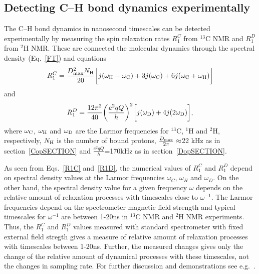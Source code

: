 \documentclass[aps,prl,superscriptaddress,twocolumn]{revtex4}
\begin{document}
\subsection{Detecting C--H bond dynamics experimentally}

The C--H bond dynamics in nanosecond timescales can be detected experimentally by measuring
the spin relaxation rates $R_1^C$ from $^{13}$C NMR and $R_1^D$ from $^2$H NMR. 
These are connected the molecular dynamics through the spectral density (Eq.~\ref{FT}) and equations
\begin{equation}\label{R1C}
R_{1}^{C}=\frac{D_{\rm{max}}^2N_{\rm{H}}}{20}\bigg[j(\omega_{\rm{H}}-\omega_{\rm{C}})+3j(\omega_{\rm{C}})+6j(\omega_{\rm{C}}+\omega_{\rm{H}})\bigg]
\end{equation}
and
\begin{equation}\label{R1D}
R_{1}^{D}=\frac{12\pi^2}{40}\bigg(\frac{e^2qQ}{h}\bigg)^2\bigg[j(\omega_{\rm{D}})+4j(2\omega_{\rm{D}})\bigg],
\end{equation}
where $\omega_{\rm{C}}$, $\omega_{\rm{H}}$ and $\omega_{\rm{D}}$ are the Larmor frequencies for $^{13}$C, $^1$H and $^2$H, respectively, 
$N_{\rm{H}}$ is the number of bound protons, $\frac{D_{\rm{max}}}{2\pi}\approx$22 kHz as in section~\ref{CopSECTION} and
$\frac{e^2qQ}{h}$=170kHz as in section~\ref{DopSECTION}.

As seen from Eqs.~\ref{R1C} and~\ref{R1D}, the numerical values of $R_1^{C}$ and $R_1^{D}$ depend on 
spectral density values at the Larmor frequencies $\omega_C$, $\omega_H$ and $\omega_D$.
On the other hand, the spectral density value for a given frequency $\omega$ 
depends on the relative amount of relaxation processes with timescales close to $\omega^{-1}$.
The Larmor frequencies depend on the spectrometer magnetic field strength and typical
timescales for $\omega^{-1}$ are between 1-20ns in $^{13}$C NMR and $^2$H NMR experiments.
Thus, the $R_1^{C}$ and $R_1^{D}$ values measured with standard spectrometer with fixed external
field stregth gives a measure of relative amount of relaxation processes with timescales between 1-20ns.
Further, the measured changes gives only the change of the relative amount of dynamical processes with
these timescales, not the changes in sampling rate. For further discussion and demonstrations see e.g.~\cite{ferreira15}.
\end{document}
